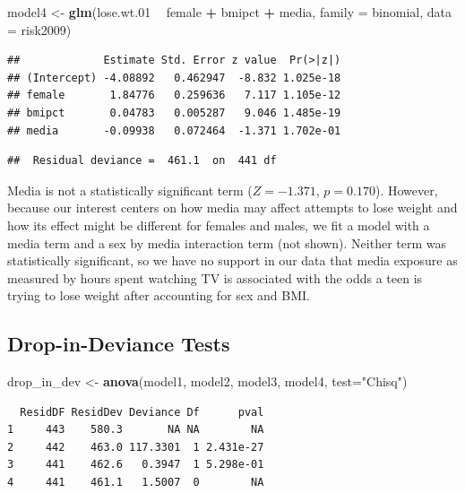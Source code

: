 \documentclass[
]{krantz}
\newenvironment{Shaded}{\begin{snugshade}}{\end{snugshade}}
\newcommand{\DataTypeTok}[1]{\textcolor[rgb]{0.27,0.27,0.27}{#1}}
\newcommand{\FloatTok}[1]{\textcolor[rgb]{0.06,0.06,0.06}{#1}}
\newcommand{\KeywordTok}[1]{\textcolor[rgb]{0.27,0.27,0.27}{\textbf{#1}}}
\newcommand{\NormalTok}[1]{#1}
\newcommand{\OperatorTok}[1]{\textcolor[rgb]{0.43,0.43,0.43}{\textbf{#1}}}
\newcommand{\StringTok}[1]{\textcolor[rgb]{0.5,0.5,0.5}{#1}}
\begin{document}
\begin{Shaded}
\begin{Highlighting}[]
\NormalTok{model4 <-}\StringTok{ }\KeywordTok{glm}\NormalTok{(lose.wt}\FloatTok{.01} \OperatorTok{~}\StringTok{ }\NormalTok{female }\OperatorTok{+}\StringTok{ }\NormalTok{bmipct }\OperatorTok{+}\StringTok{ }\NormalTok{media, }
              \DataTypeTok{family =}\NormalTok{ binomial, }\DataTypeTok{data =}\NormalTok{ risk2009)}
\end{Highlighting}
\end{Shaded}

\begin{verbatim}
##             Estimate Std. Error z value  Pr(>|z|)
## (Intercept) -4.08892   0.462947  -8.832 1.025e-18
## female       1.84776   0.259636   7.117 1.105e-12
## bmipct       0.04783   0.005287   9.046 1.485e-19
## media       -0.09938   0.072464  -1.371 1.702e-01
\end{verbatim}

\begin{verbatim}
##  Residual deviance =  461.1  on  441 df
\end{verbatim}

Media is not a statistically significant term (\(Z=-1.371\), \(p=0.170\)). However, because our interest centers on how media may affect attempts to lose weight and how its effect might be different for females and males, we fit a model with a media term and a sex by media interaction term (not shown). Neither term was statistically significant, so we have no support in our data that media exposure as measured by hours spent watching TV is associated with the odds a teen is trying to lose weight after accounting for sex and BMI.

\hypertarget{drop-in-deviance-tests}{%
\subsection{Drop-in-Deviance Tests}\label{drop-in-deviance-tests}}

\begin{Shaded}
\begin{Highlighting}[]
\NormalTok{drop_in_dev <-}\StringTok{ }\KeywordTok{anova}\NormalTok{(model1, model2, model3, model4,}
                     \DataTypeTok{test=}\StringTok{"Chisq"}\NormalTok{)}
\end{Highlighting}
\end{Shaded}

\begin{verbatim}
  ResidDF ResidDev Deviance Df      pval
1     443    580.3       NA NA        NA
2     442    463.0 117.3301  1 2.431e-27
3     441    462.6   0.3947  1 5.298e-01
4     441    461.1   1.5007  0        NA
\end{verbatim}
\end{document}

